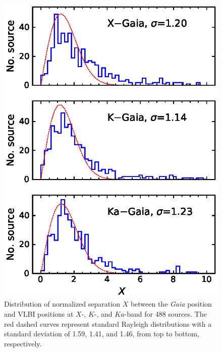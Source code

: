 \documentclass{aa-note}   %
\begin{document}
\begin{figure}[hbtp]
    \centering
    \includegraphics[width=\columnwidth]{figs/X-hist}
    \caption[]{\label{fig:X-hist}
        Distribution of normalized separation $X$ between the {\it Gaia} position and VLBI positions at $X$-, $K$-, and $Ka$-band for 488 sources.
        The red dashed curves represent standard Rayleigh distributions with a standard deviation of 1.59, 1.41, and 1.46, from top to bottom, respectively.
    }
\end{figure}
\end{document}
